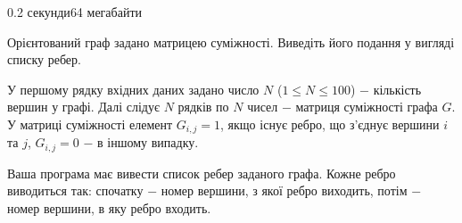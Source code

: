\begin{problem}{}{}{}{0.2 секунди}{64 мегабайти}

Орієнтований граф задано матрицею суміжності. Виведіть його подання у вигляді списку ребер.

\InputFile
У першому рядку вхідних даних задано число $N$ ($1 \le N \le 100$) $-$ кількість вершин у графі.
Далі слідує $N$ рядків по $N$ чисел $-$ матриця суміжності графа $G$. У матриці суміжності елемент $G_{i,j}=1$, якщо
існує ребро, що з'єднує вершини $i$ та $j$, $G_{i,j}=0$ $-$ в іншому випадку.

\OutputFile
Ваша програма має вивести список ребер заданого графа. Кожне ребро виводиться так: спочатку $-$
номер вершини, з якої ребро виходить, потім $-$ номер вершини, в яку ребро входить.

\Example

\begin{example}
%
\end{example}

\end{problem}

